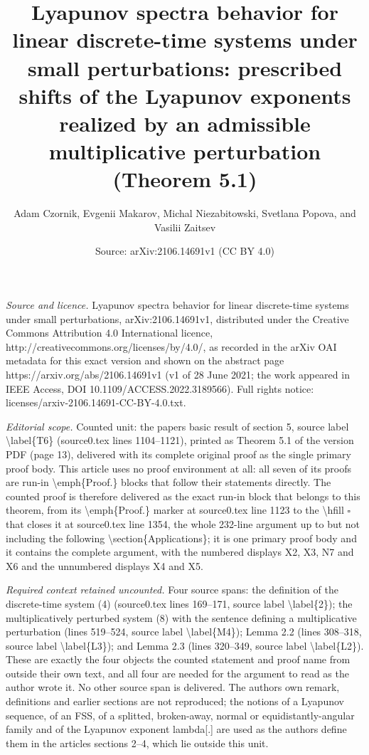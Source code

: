 \documentclass[10pt,a4paper]{amsart}
\title[Lyapunov spectra behavior for linear discrete-time systems under small perturbations]{Lyapunov spectra behavior for linear discrete-time systems under small perturbations: prescribed shifts of the Lyapunov exponents realized by an admissible multiplicative perturbation (Theorem 5.1)}
\author{Adam Czornik, Evgenii Makarov, Michal Niezabitowski, Svetlana Popova, and Vasilii Zaitsev}
\date{Source: arXiv:2106.14691v1 (CC BY 4.0)}
\theoremstyle{plain}
\begin{document}
\maketitle
\noindent\emph{Source and licence.} Lyapunov spectra behavior for linear discrete-time systems under small perturbations, arXiv:2106.14691v1, distributed under the Creative Commons Attribution 4.0 International licence, http://creativecommons.org/licenses/by/4.0/, as recorded in the arXiv OAI metadata for this exact version and shown on the abstract page https://arxiv.org/abs/2106.14691v1 (v1 of 28 June 2021; the work appeared in IEEE Access, DOI 10.1109/ACCESS.2022.3189566). Full rights notice: licenses/arxiv-2106.14691-CC-BY-4.0.txt.\par\smallskip
\noindent\textit{Editorial scope.} Counted unit: the paper\textquotesingle s basic result of section 5, source label \textbackslash{}label\{T6\} (source0.tex lines 1104--1121), printed as Theorem 5.1 of the version PDF (page 13), delivered with its complete original proof as the single primary proof body. This article uses no proof environment at all: all seven of its proofs are run-in \textbackslash{}emph\{Proof.\} blocks that follow their statements directly. The counted proof is therefore delivered as the exact run-in block that belongs to this theorem, from its \textbackslash{}emph\{Proof.\} marker at source0.tex line 1123 to the \textbackslash{}hfill $\square$ that closes it at source0.tex line 1354, the whole 232-line argument up to but not including the following \textbackslash{}section\{Applications\}; it is one primary proof body and it contains the complete argument, with the numbered displays X2, X3, N7 and X6 and the unnumbered displays X4 and X5.\par
\noindent\textit{Required context retained uncounted.} Four source spans: the definition of the discrete-time system (4) (source0.tex lines 169--171, source label \textbackslash{}label\{2\}); the multiplicatively perturbed system (8) with the sentence defining a multiplicative perturbation (lines 519--524, source label \textbackslash{}label\{M4\}); Lemma 2.2 (lines 308--318, source label \textbackslash{}label\{L3\}); and Lemma 2.3 (lines 320--349, source label \textbackslash{}label\{L2\}). These are exactly the four objects the counted statement and proof name from outside their own text, and all four are needed for the argument to read as the author wrote it. No other source span is delivered. The author\textquotesingle s own remark, definitions and earlier sections are not reproduced; the notions of a Lyapunov sequence, of an FSS, of a splitted, broken-away, normal or equidistantly-angular family and of the Lyapunov exponent lambda[.] are used as the authors define them in the article\textquotesingle s sections 2--4, which lie outside this unit.\par
\end{document}
